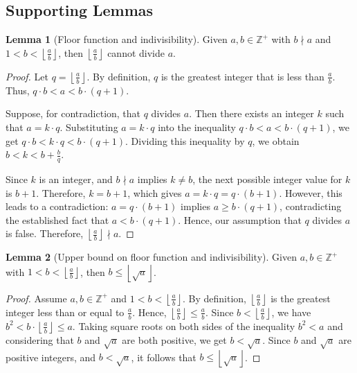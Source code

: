 \documentclass{article}
\theoremstyle{plain}
\theoremstyle{definition}
\newtheorem{lemma}{Lemma}
\begin{document}
\subsection{Supporting Lemmas}

\begin{lemma}[Floor function and indivisibility]
\label{lemma:floornondivisor}
Given $a,b \in \mathbb{Z}^{+}$ with \(b \nmid a\) and \( 1 < b < \left\lfloor \frac{a}{b} \right\rfloor \), then \(\left\lfloor \frac{a}{b} \right\rfloor \) cannot divide \(a\).
\end{lemma}
\begin{proof}
Let \(q = \left\lfloor \frac{a}{b} \right\rfloor\). By definition, \(q\) is the greatest integer that is less than \(\frac{a}{b}\). Thus, \(q \cdot b < a < b \cdot (q + 1)\).

Suppose, for contradiction, that \(q\) divides \(a\). Then there exists an integer \(k\) such that \(a = k \cdot q\). Substituting \(a = k \cdot q\) into the inequality \(q \cdot b < a < b \cdot (q + 1) \), we get \(q \cdot b < k \cdot q < b \cdot (q + 1) \). Dividing this inequality by \(q\), we obtain \(b < k < b + \frac{b}{q}\).

Since \(k\) is an integer, and \(b \nmid a\) implies \(k \neq b\), the next possible integer value for \(k\) is \(b + 1\). Therefore, \(k = b + 1\), which gives \(a = k \cdot q = q \cdot (b + 1)\). However, this leads to a contradiction: \(a = q \cdot (b + 1) \) implies \(a \geq b \cdot (q + 1) \), contradicting the established fact that \(a < b \cdot (q + 1) \). Hence, our assumption that \(q\) divides \(a\) is false. Therefore, \(\left\lfloor \frac{a}{b} \right\rfloor \nmid a\).
\end{proof}

\begin{lemma}[Upper bound on floor function and indivisibility]
\label{lemma:floornondivisorupperbound}
Given $a,b \in \mathbb{Z}^{+}$ with \( 1 < b < \left\lfloor \frac{a}{b} \right\rfloor \), then \(b \leq \left\lfloor \sqrt{a} \right\rfloor\).
\end{lemma}
\begin{proof}
Assume \( a, b \in \mathbb{Z}^{+} \) and \( 1 < b < \left\lfloor \frac{a}{b} \right\rfloor \). By definition, \( \left\lfloor \frac{a}{b} \right\rfloor \) is the greatest integer less than or equal to \( \frac{a}{b} \). Hence, \( \left\lfloor \frac{a}{b} \right\rfloor \leq \frac{a}{b} \). Since \( b < \left\lfloor \frac{a}{b} \right\rfloor \), we have \( b^2 < b \cdot \left\lfloor \frac{a}{b} \right\rfloor \leq a \). Taking square roots on both sides of the inequality \( b^2 < a \) and considering that \( b \) and \( \sqrt{a} \) are both positive, we get \( b < \sqrt{a} \). Since \( b \) and \( \sqrt{a} \) are positive integers, and \( b < \sqrt{a} \), it follows that \( b \leq \left\lfloor \sqrt{a} \right\rfloor \).
\end{proof}
\end{document}
